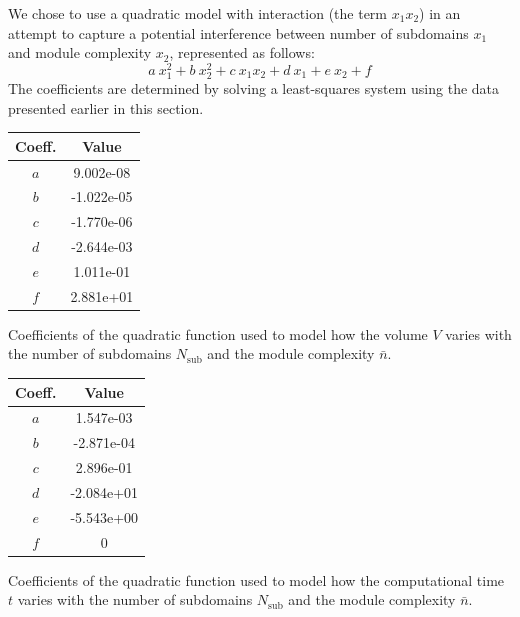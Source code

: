 We chose to use a quadratic model with interaction (the term $x_1x_2$) in an attempt to capture a potential interference between number of subdomains $x_1$ and module complexity $x_2$, represented as follows:
\begin{equation}
    a\:x_1^2+b\:x_2^2+c\:x_1x_2+d\:x_1+e\:x_2+f
\end{equation}
The coefficients are determined by solving a least-squares system using the data presented earlier in this section.

\begin{margintable}
    \small
    \centering
    \begin{tabular}{cS[table-number-alignment = center, table-format = 1.2e1]}
    \toprule
    \textbf{Coeff.} & {\textbf{Value}} \\ \midrule
    $a$ & 9.002e-08    \\
    $b$ &  -1.022e-05   \\
    $c$ &  -1.770e-06   \\
    $d$ &  -2.644e-03   \\
    $e$ &   1.011e-01  \\
    $f$ &   2.881e+01  \\
    \bottomrule
    \end{tabular}
    \caption{Coefficients of the quadratic function used to model how the volume $V$ varies with the number of subdomains $N_\text{sub}$ and the module complexity $\bar{n}$.}
    \label{tab:05_doe_coeff_v}
\end{margintable}

\begin{margintable}
    \small
    \centering
    \begin{tabular}{cS[table-number-alignment = center, table-format = 1.2e1]}
    \toprule
    \textbf{Coeff.} & {\textbf{Value}} \\ \midrule
    $a$ & 1.547e-03    \\
    $b$ & -2.871e-04    \\
    $c$ &  2.896e-01   \\
    $d$ &  -2.084e+01   \\
    $e$ &  -5.543e+00   \\
    $f$ & 0    \\
    \bottomrule
    \end{tabular}
    \caption{Coefficients of the quadratic function used to model how the computational time $t$ varies with the number of subdomains $N_\text{sub}$ and the module complexity $\bar{n}$.}
    \label{tab:05_doe_coeff_t}
\end{margintable}

